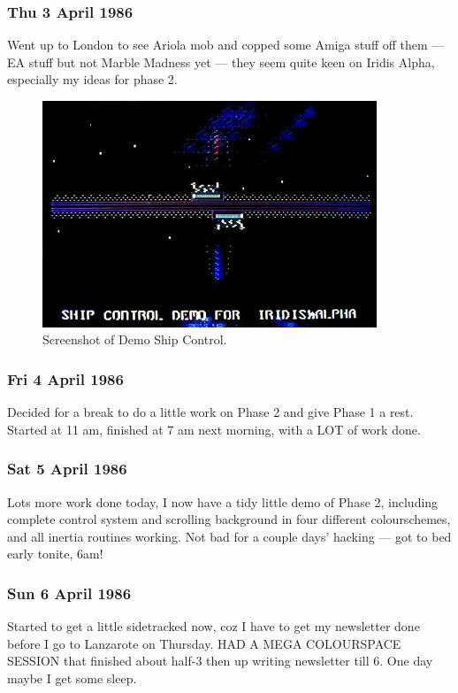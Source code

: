 \subsubsection{Thu 3 April 1986}
Went up to London to see Ariola mob and copped some Amiga stuff off them — EA stuff but not Marble Madness yet — they seem quite keen on Iridis Alpha, especially my ideas for phase 2.

\begin{figure}[H]
    \centering
      \includegraphics[width=10cm]{src/diary/zzap15_pic2.jpg}%
\caption{Screenshot of Demo Ship Control.}
\end{figure}

\subsubsection{Fri 4 April 1986}
Decided for a break to do a little work on Phase 2 and give Phase 1 a rest. Started at 11 am, finished at 7 am next morning, with a LOT of work done.

\subsubsection{Sat 5 April 1986}
Lots more work done today, I now have a tidy little demo of Phase 2, including complete control system and scrolling background in four different colourschemes, and all inertia routines working. Not bad for a couple days' hacking — got to bed early tonite, 6am!

\subsubsection{Sun 6 April 1986}
Started to get a little sidetracked now, coz I have to get my newsletter done before I go to Lanzarote on Thursday. HAD A MEGA COLOURSPACE SESSION that finished about half-3 then up writing newsletter till 6. One day maybe I get some sleep.

